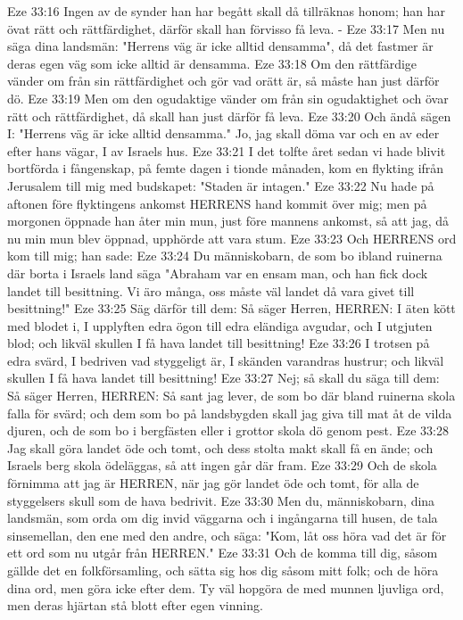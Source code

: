Eze 33:16  Ingen av de synder han har begått skall då tillräknas honom; han har övat rätt och rättfärdighet, därför skall han förvisso få leva. -
Eze 33:17  Men nu säga dina landsmän: "Herrens väg är icke alltid densamma", då det fastmer är deras egen väg som icke alltid är densamma.
Eze 33:18  Om den rättfärdige vänder om från sin rättfärdighet och gör vad orätt är, så måste han just därför dö.
Eze 33:19  Men om den ogudaktige vänder om från sin ogudaktighet och övar rätt och rättfärdighet, då skall han just därför få leva.
Eze 33:20  Och ändå sägen I: "Herrens väg är icke alltid densamma." Jo, jag skall döma var och en av eder efter hans vägar, I av Israels hus.
Eze 33:21  I det tolfte året sedan vi hade blivit bortförda i fångenskap, på femte dagen i tionde månaden, kom en flykting ifrån Jerusalem till mig med budskapet: "Staden är intagen."
Eze 33:22  Nu hade på aftonen före flyktingens ankomst HERRENS hand kommit över mig; men på morgonen öppnade han åter min mun, just före mannens ankomst, så att jag, då nu min mun blev öppnad, upphörde att vara stum.
Eze 33:23  Och HERRENS ord kom till mig; han sade:
Eze 33:24  Du människobarn, de som bo ibland ruinerna där borta i Israels land säga "Abraham var en ensam man, och han fick dock landet till besittning. Vi äro många, oss måste väl landet då vara givet till besittning!"
Eze 33:25  Säg därför till dem: Så säger Herren, HERREN: I äten kött med blodet i, I upplyften edra ögon till edra eländiga avgudar, och I utgjuten blod; och likväl skullen I få hava landet till besittning!
Eze 33:26  I trotsen på edra svärd, I bedriven vad styggeligt är, I skänden varandras hustrur; och likväl skullen I få hava landet till besittning!
Eze 33:27  Nej; så skall du säga till dem: Så säger Herren, HERREN: Så sant jag lever, de som bo där bland ruinerna skola falla för svärd; och dem som bo på landsbygden skall jag giva till mat åt de vilda djuren, och de som bo i bergfästen eller i grottor skola dö genom pest.
Eze 33:28  Jag skall göra landet öde och tomt, och dess stolta makt skall få en ände; och Israels berg skola ödeläggas, så att ingen går där fram.
Eze 33:29  Och de skola förnimma att jag är HERREN, när jag gör landet öde och tomt, för alla de styggelsers skull som de hava bedrivit.
Eze 33:30  Men du, människobarn, dina landsmän, som orda om dig invid väggarna och i ingångarna till husen, de tala sinsemellan, den ene med den andre, och säga: "Kom, låt oss höra vad det är för ett ord som nu utgår från HERREN."
Eze 33:31  Och de komma till dig, såsom gällde det en folkförsamling, och sätta sig hos dig såsom mitt folk; och de höra dina ord, men göra icke efter dem. Ty väl hopgöra de med munnen ljuvliga ord, men deras hjärtan stå blott efter egen vinning.
